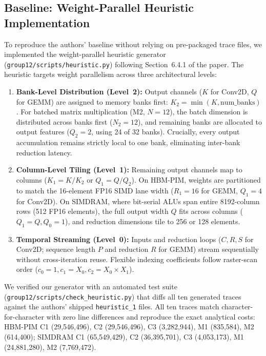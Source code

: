
\subsection{Baseline: Weight-Parallel Heuristic Implementation}
\label{sec:heuristic}
To reproduce the authors' baseline without relying on pre-packaged trace files, we implemented the weight-parallel heuristic generator (\texttt{group12/scripts/heuristic.py}) following Section~6.4.1 of the paper. The heuristic targets weight parallelism across three architectural levels:
\begin{enumerate}
    \item \textbf{Bank-Level Distribution (Level~2):} Output channels ($K$ for Conv2D, $Q$ for GEMM) are assigned to memory banks first: $K_2 = \min(K, \text{num\_banks})$. For batched matrix multiplication (M2, $N=12$), the batch dimension is distributed across banks first ($N_2=12$), and remaining banks are allocated to output features ($Q_2=2$, using 24 of 32 banks). Crucially, every output accumulation remains strictly local to one bank, eliminating inter-bank reduction latency.
    \item \textbf{Column-Level Tiling (Level~1):} Remaining output channels map to columns ($K_1 = K / K_2$ or $Q_1 = Q / Q_2$). On HBM-PIM, weights are partitioned to match the 16-element FP16 SIMD lane width ($R_1=16$ for GEMM, $Q_1=4$ for Conv2D). On SIMDRAM, where bit-serial ALUs span entire 8192-column rows (512 FP16 elements), the full output width $Q$ fits across columns ($Q_1=Q, Q_0=1$), and reduction dimensions tile to 256 or 128 elements.
    \item \textbf{Temporal Streaming (Level~0):} Inputs and reduction loops ($C, R, S$ for Conv2D; sequence length $P$ and reduction $R$ for GEMM) stream sequentially without cross-iteration reuse. Flexible indexing coefficients follow raster-scan order ($c_0=1, c_1=X_0, c_2=X_0 \times X_1$).
\end{enumerate}

We verified our generator with an automated test suite (\texttt{group12/scripts/check_heuristic.py}) that diffs all ten generated traces against the authors' shipped \texttt{heuristic\_1} files. All ten traces match character-for-character with zero line differences and reproduce the exact analytical costs:
HBM-PIM C1 (29,546,496), C2 (29,546,496), C3 (3,282,944), M1 (835,584), M2 (614,400);
SIMDRAM C1 (65,549,429), C2 (36,395,701), C3 (4,053,173), M1 (24,881,280), M2 (7,769,472).

